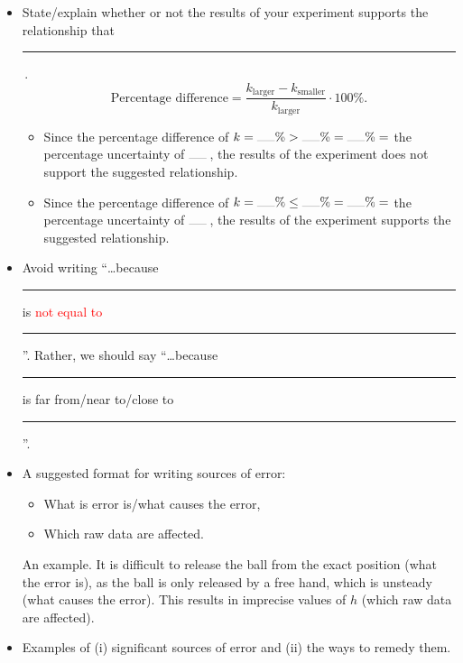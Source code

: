 \documentclass[oneside]{book}
\begin{document}
\begin{itemize}
    \item State/explain whether or not the results of your experiment supports the relationship that \rule{1cm}{0.05mm}\,.
    \[\text{Percentage difference}=\frac{k_{\text{larger}}-k_{\text{smaller}}}{k_{\text{larger}}}\cdot 100\%.\]
    \begin{itemize}
        \item Since the percentage difference of \(k=\rule{0.5cm}{0.05mm}\%>\rule{0.5cm}{0.05mm}\%=\rule{0.5cm}{0.05mm}\%={}\)the percentage uncertainty of \(\rule{0.5cm}{0.05mm}\)\,, the results of the experiment does not support the suggested relationship.
        \item Since the percentage difference of \(k=\rule{0.5cm}{0.05mm}\%\leq\rule{0.5cm}{0.05mm}\%=\rule{0.5cm}{0.05mm}\%={}\)the percentage uncertainty of \(\rule{0.5cm}{0.05mm}\)\,, the results of the experiment supports the suggested relationship.
    \end{itemize}
    \item Avoid writing ``\dots because \rule{0.5cm}{0.05mm} is \textcolor{red}{not equal to} \rule{0.5cm}{0.05mm}''. Rather, we should say ``\dots because \rule{0.5cm}{0.05mm} is \textcolor{green!70!black}{far from/near to/close to} \rule{0.5cm}{0.05mm}''.
    \item A suggested format for writing sources of error:
    \begin{itemize}
        \item What is error is/what causes the error, 
        \item Which raw data are affected.
    \end{itemize}
    An example. It is difficult to release the ball from the exact position (what the error is), as the ball is only released by a free hand, which is unsteady (what causes the error). This results in imprecise values of \(h\) (which raw data are affected).
    \item Examples of (i) significant sources of error and (ii) the ways to remedy them.

\end{itemize}
\end{document}
